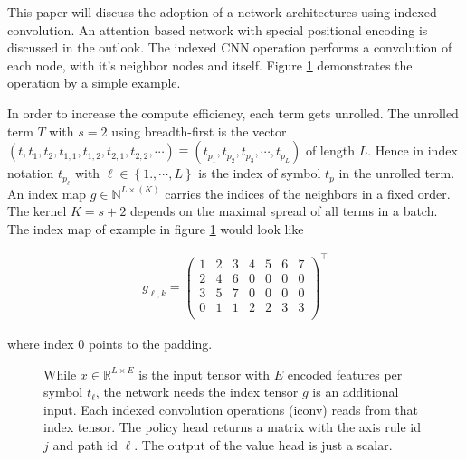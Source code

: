 \documentclass{scrartcl}
\theoremstyle{definition}
\begin{document}
This paper will discuss the adoption of a network architectures using indexed convolution.
An attention based network with special positional encoding is discussed in the outlook. 
The indexed CNN operation performs a convolution of each node, with it's neighbor nodes and itself.
Figure \ref{fig:index_tensor} demonstrates the operation by a simple example.

\begin{figure}[!htbp]
	\centering
	
	\label{fig:index_tensor}
\end{figure}

In order to increase the compute efficiency, each term gets unrolled.
The unrolled term $T$ with $s=2$ using breadth-first is the vector $\left( t, t_1, t_2, t_{1,1},t_{1,2}, t_{2,1}, t_{2,2}, \cdots \right) \equiv  \left( t_{p_1}, t_{p_2}, t_{p_3},\cdots, t_{p_L} \right)$ of length $L$.
Hence in index notation $t_{p_\ell}$ with $\ell \in \left\{1., \cdots,L\right\}$ is the index of symbol $t_p$ in the unrolled term.
An index map $g \in \mathbb{N}^{L\times \left(K\right)}$ carries the indices of the neighbors in a fixed order.
The kernel $K= s+2$ depends on the maximal spread of all terms in a batch.
The index map of example in figure \ref{fig:index_tensor} would look like

\begin{align}
	g_{\ell,k} = 
	\begin{pmatrix}
		1 & 2 & 3 & 4 & 5 & 6 & 7 \\
		2 & 4 & 6 & 0 & 0 & 0 & 0 \\
		3 & 5 & 7 & 0 & 0 & 0 & 0 \\
		0 & 1 & 1 & 2 & 2 & 3 & 3 \\
	\end{pmatrix}^\top
\end{align}

where index $0$ points to the padding.


\begin{figure}[!htbp]
	\centering
	
	\caption{While $x\in \mathbb{R}^{L\times E}$ is the input tensor with $E$ encoded features per symbol $t_\ell$, the network needs the index tensor $g$ is an additional input.
		Each indexed convolution operations (iconv) reads from that index tensor.
		The policy head returns a matrix with the axis rule id $j$ and path id $\ell$. 
		The output of the value head is just a scalar. 
	}
	\label{fig:iconv_network}
\end{figure}
\end{document}
